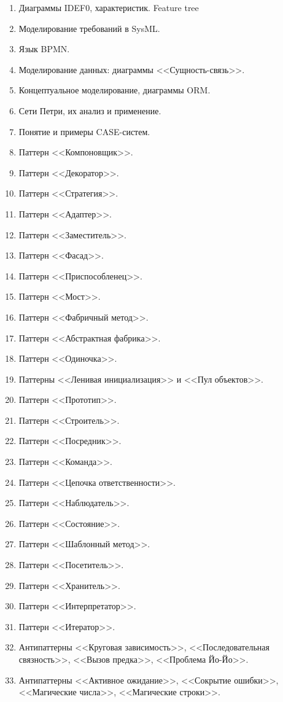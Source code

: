 \documentclass[a5paper]{article}
\begin{document}
\begin{enumerate}
    \item Диаграммы IDEF0, характеристик. Feature tree 
    \item Моделирование требований в SysML.
    \item Язык BPMN.
    \item Моделирование данных: диаграммы <<Сущность-связь>>.
    \item Концептуальное моделирование, диаграммы ORM.
    \item Сети Петри, их анализ и применение.
    \item Понятие и примеры CASE-систем.
    \item Паттерн <<Компоновщик>>.
    \item Паттерн <<Декоратор>>.
    \item Паттерн <<Стратегия>>.
    \item Паттерн <<Адаптер>>.
    \item Паттерн <<Заместитель>>.
    \item Паттерн <<Фасад>>.
    \item Паттерн <<Приспособленец>>.
    \item Паттерн <<Мост>>.
    \item Паттерн <<Фабричный метод>>.
    \item Паттерн <<Абстрактная фабрика>>.
    \item Паттерн <<Одиночка>>.
    \item Паттерны <<Ленивая инициализация>> и <<Пул объектов>>.
    \item Паттерн <<Прототип>>.
    \item Паттерн <<Строитель>>.
    \item Паттерн <<Посредник>>.
    \item Паттерн <<Команда>>.
    \item Паттерн <<Цепочка ответственности>>.
    \item Паттерн <<Наблюдатель>>.
    \item Паттерн <<Состояние>>.
    \item Паттерн <<Шаблонный метод>>.
    \item Паттерн <<Посетитель>>.
    \item Паттерн <<Хранитель>>.
    \item Паттерн <<Интерпретатор>>.
    \item Паттерн <<Итератор>>.
    \item Антипаттерны <<Круговая зависимость>>, <<Последовательная связность>>, <<Вызов предка>>, <<Проблема Йо-Йо>>.
    \item Антипаттерны <<Активное ожидание>>, <<Сокрытие ошибки>>, <<Магические числа>>, <<Магические строки>>.

\end{enumerate}
\end{document}

